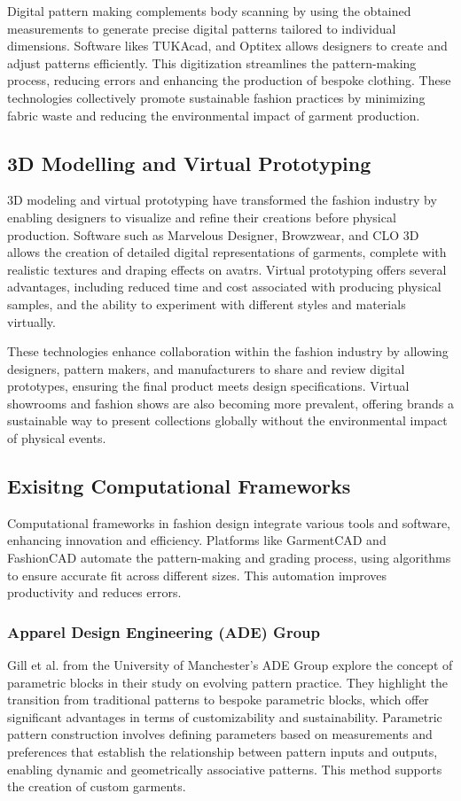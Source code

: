 Digital pattern making complements body scanning by using the obtained measurements to generate precise digital patterns tailored to individual dimensions. Software likes TUKAcad, and Optitex allows designers to create and adjust patterns efficiently. This digitization streamlines the pattern-making process, reducing errors and enhancing the production of bespoke clothing. These technologies collectively promote sustainable fashion practices by minimizing fabric waste and reducing the environmental impact of garment production.

\subsection{3D Modelling and Virtual Prototyping}
3D modeling and virtual prototyping have transformed the fashion industry by enabling designers to visualize and refine their creations before physical production. Software such as Marvelous Designer, Browzwear, and CLO 3D allows the creation of detailed digital representations of garments, complete with realistic textures and draping effects on avatrs. Virtual prototyping offers several advantages, including reduced time and cost associated with producing physical samples, and the ability to experiment with different styles and materials virtually.

These technologies enhance collaboration within the fashion industry by allowing designers, pattern makers, and manufacturers to share and review digital prototypes, ensuring the final product meets design specifications. Virtual showrooms and fashion shows are also becoming more prevalent, offering brands a sustainable way to present collections globally without the environmental impact of physical events.

\subsection{Exisitng Computational Frameworks}
Computational frameworks in fashion design integrate various tools and software, enhancing innovation and efficiency. Platforms like GarmentCAD and FashionCAD automate the pattern-making and grading process, using algorithms to ensure accurate fit across different sizes. This automation improves productivity and reduces errors.

\subsubsection{Apparel Design Engineering (ADE) Group}
Gill et al. from the University of Manchester's ADE Group explore the concept of parametric blocks in their study on evolving pattern practice. They highlight the transition from traditional patterns to bespoke parametric blocks, which offer significant advantages in terms of customizability and sustainability. Parametric pattern construction involves defining parameters based on measurements and preferences that establish the relationship between pattern inputs and outputs, enabling dynamic and geometrically associative patterns. This method supports the creation of custom garments.

